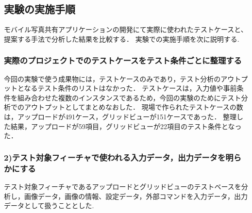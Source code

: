 \documentclass[a4paper,12pt]{jreport}
\begin{document}
\subsection{実験の実施手順}
モバイル写真共有アプリケーションの開発にて実際に使われたテストケースと、提案する手法で分析した結果を比較する．
実験での実施手順を次に説明する.
\subsubsection{実際のプロジェクトでのテストケースをテスト条件ごとに整理する}
今回の実験で使う成果物には，テストケースのみであり，テスト分析のアウトプットとなるテスト条件のリストはなかった．
テストケースは，入力値や事前条件を組み合わせた複数のインスタンスであるため，今回の実験のためにテスト分析でのアウトプットとしてまとめなおした．
現場で作られたテストケースの数は，アップロードが491ケース，グリッドビューが151ケースであった．
整理した結果，アップロードが59項目，グリッドビューが22項目のテスト条件となった．

\subsubsection{2)テスト対象フィーチャで使われる入力データ，出力データを明らかにする}
テスト対象フィーチャであるアップロードとグリッドビューのテストベースを分析し，画像データ，画像の情報、設定データ，外部コマンドを入力データ，出力データとして扱うこととした.
\end{document}
